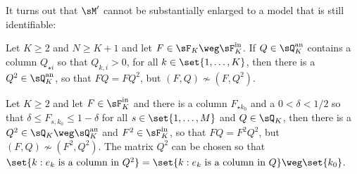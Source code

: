 \documentclass[12pt,a4paper]{article}
\begin{document}
It turns out that $\sM'$ cannot be substantially enlarged to a model  that is still identifiable:
\begin{theorem}\label{thm:identifiabilityanchorinQcounterexample}
    Let $K\ge 2$ and $N\ge K+1$  and let $F\in \sF_K\weg\sF_K^{\text{in}}$. If $Q\in\sQ_K^{\text{an}}$ contains a column $Q_{\star i}$ so that $Q_{k,i}>0$, for all $k\in\set{1,\ldots,K}$, then there is a $Q^2\in\sQ_K^{\text{an}}$,  so that $FQ=FQ^2$, but $(F,Q)\not\sim (F,Q^2)$. 
    
 Let $K\ge2$ and let $F\in\sF_K^{\text{in}}$ and there is a column $F_{\star k_0}$ and a $0<\delta<1/2$ so that $\delta\le F_{s,k_0}\le 1-\delta$ for all $s\in\set{1,\ldots,M}$  and $Q\in\sQ_K$, then there is a $Q^2\in \sQ_K\weg\sQ_K^{\text{an}}$ and $F^2\in\sF_K^{\text{in}}$, so that $FQ=F^2Q^2$, but $(F,Q)\not\sim (F^2,Q^2)$. The matrix $Q^2$ can be chosen so that $\set{k: e_k \text{ is a column in }Q^2}=\set{k: e_k \text{ is a column in }Q}\weg\set{k_0}$. 
\end{theorem}
\end{document}
